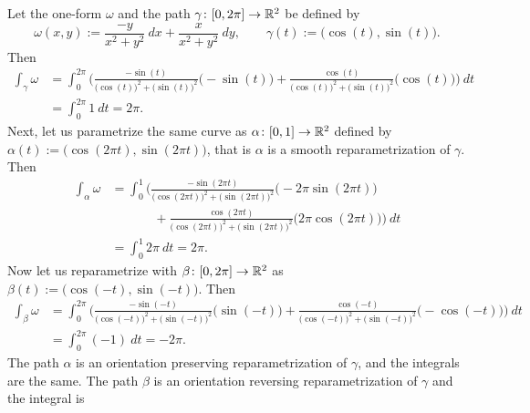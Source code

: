 \begin{example} \label{example:mv:irrotoneformint}
Let the one-form $\omega$ and the path $\gamma \colon [0,2\pi] \to {\mathbb{R}}^2$ be defined by
\begin{equation*}
\omega(x,y) := \frac{-y}{x^2+y^2} ~dx + \frac{x}{x^2+y^2} ~dy,
\qquad
\gamma(t) := \bigl(\cos(t),\sin(t)\bigr) .
\end{equation*}
Then
\begin{equation*}
\begin{split}
\int_{\gamma} \omega
& =
\int_0^{2\pi}
\Biggl(
\frac{-\sin(t)}{{\bigl(\cos(t)\bigr)}^2+{\bigl(\sin(t)\bigr)}^2}
\bigl(-\sin(t)\bigr)
+
\frac{\cos(t)}{{\bigl(\cos(t)\bigr)}^2+{\bigl(\sin(t)\bigr)}^2}
\bigl(\cos(t)\bigr)
\Biggr) ~ dt
\\
& =
\int_0^{2\pi}
1 ~ dt
= 2\pi .
\end{split}
\end{equation*}
Next, let us parametrize the same curve as
$\alpha \colon [0,1] \to {\mathbb{R}}^2$ defined by $\alpha(t) := \bigl(\cos(2\pi
t),\sin(2 \pi t)\bigr)$, that is $\alpha$ is a smooth reparametrization of
$\gamma$.  Then
\begin{equation*}
\begin{split}
\int_{\alpha} \omega
& =
\int_0^{1}
\Biggl(
\frac{-\sin(2\pi t)}{{\bigl(\cos(2\pi t)\bigr)}^2+{\bigl(\sin(2\pi t)\bigr)}^2}
\bigl(-2\pi \sin(2\pi t)\bigr)
\\
& \phantom{=\int_0^1\Biggl(~}
+
\frac{\cos(2 \pi t)}{{\bigl(\cos(2 \pi t)\bigr)}^2+{\bigl(\sin(2 \pi t)\bigr)}^2}
\bigl(2 \pi \cos(2 \pi t)\bigr)
\Biggr) ~ dt
\\
& =
\int_0^{1}
2\pi ~ dt
= 2\pi .
\end{split}
\end{equation*}
Now let us reparametrize with $\beta \colon [0,2\pi] \to {\mathbb{R}}^2$
as $\beta(t) := \bigl(\cos(-t),\sin(-t)\bigr)$.  Then
\begin{equation*}
\begin{split}
\int_{\beta} \omega
& =
\int_0^{2\pi}
\Biggl(
\frac{-\sin(-t)}{{\bigl(\cos(-t)\bigr)}^2+{\bigl(\sin(-t)\bigr)}^2}
\bigl(\sin(-t)\bigr)
+
\frac{\cos(-t)}{{\bigl(\cos(-t)\bigr)}^2+{\bigl(\sin(-t)\bigr)}^2}
\bigl(-\cos(-t)\bigr)
\Biggr) ~ dt
\\
& =
\int_0^{2\pi}
(-1) ~ dt
= -2\pi .
\end{split}
\end{equation*}
The path $\alpha$ is an orientation preserving reparametrization of
$\gamma$, and the integrals are the same.  The path $\beta$
is an orientation reversing reparametrization of $\gamma$ and the integral is

\end{example}
